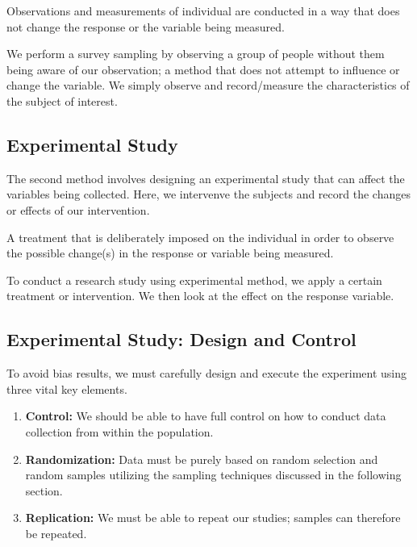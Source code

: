 \begin{definition}
Observations and measurements of individual are conducted in a way that does not change the response or the variable being measured.
\end{definition} 

\begin{example} 
We perform a survey sampling by observing a group of people without them being aware of our observation; a method that does not attempt to influence or change the variable. We simply observe and record/measure the characteristics of the subject of interest.
\end{example} 

\subsection{Experimental Study}

The second method involves designing an experimental study that can affect the variables being collected. Here, we intervenve the subjects and record the changes or effects of our intervention. 

\begin{definition}  
A treatment that is deliberately imposed on the individual in order to observe the possible change(s) in the response or variable being measured. 
\end{definition} 

\begin{example} 
To conduct a research study using experimental method, we apply a certain treatment or intervention. We then look at the effect on the response variable.  
\end{example} 

\subsection{Experimental Study: Design and Control}

To avoid bias results, we must carefully design and execute the experiment using three vital key elements. 

\begin{enumerate}
   \item {\bf{Control:}} We should be able to have full control on how to conduct data collection from within the population. 
   \item {\bf{Randomization:}} Data must be purely based on random selection and random samples utilizing the sampling techniques discussed in the following section. 
   \item {\bf{Replication:}} We must be able to repeat our studies; samples can therefore be repeated. 
\end{enumerate}

